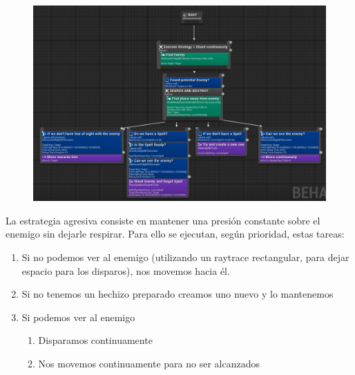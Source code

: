 \documentclass[12pt]{article}
\begin{document}
\begin{figure}[H]
    \centering
    \includegraphics[width=1\textwidth]{aggresive_behavior_tree}
\end{figure}

La estrategia agresiva consiste en mantener una presión constante sobre el enemigo sin dejarle respirar. Para ello se ejecutan, según prioridad, estas tareas:

\begin{enumerate}
	\item Si no podemos ver al enemigo (utilizando un raytrace rectangular, para dejar espacio para los disparos), nos movemos hacia él.
	\item Si no tenemos un hechizo preparado creamos uno nuevo y lo mantenemos
	\item Si podemos ver al enemigo
	\begin{enumerate}
		\item Disparamos continuamente
		\item Nos movemos continuamente para no ser alcanzados
	\end{enumerate}
\end{enumerate}
\end{document}
